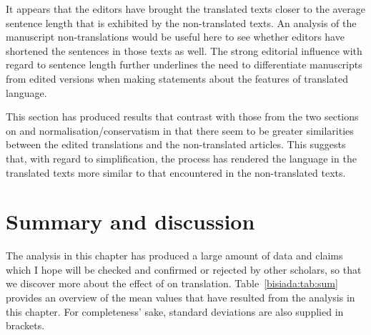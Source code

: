 \documentclass[output=paper]{LSP/langsci}
\begin{document}
It appears that the editors have brought the translated texts closer to the average sentence length that is exhibited by the non-translated texts. An analysis of the manuscript non-translations would be useful here to see whether editors have shortened the sentences in those texts as well. The strong editorial influence with regard to sentence length further underlines the need to differentiate manuscripts from edited versions when making statements about the features of translated language.

This section has produced results that contrast with those from the two sections on  and normalisation\slash conservatism in that there seem to be greater similarities between the edited translations and the non-translated articles. This suggests that, with regard to simplification, the  process has rendered the language in the translated texts more similar to that encountered in the non-translated texts.

\section{Summary and discussion}\label{bisiada:sec:disc}

The analysis in this chapter has produced a large amount of data and claims which I hope will be checked and confirmed or rejected by other scholars, so that we discover more about the effect of  on translation. Table~\ref{bisiada:tab:sum} provides an overview of the mean values that have resulted from the analysis in this chapter. For completeness' sake, standard deviations are also supplied in brackets.
\end{document}
